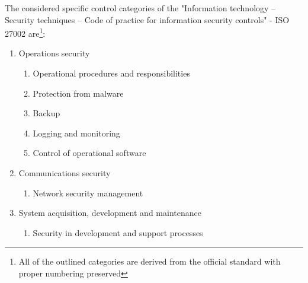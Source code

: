 The considered specific control categories of the "Information technology -- Security techniques -- Code of practice for information security controls" - ISO 27002 are\footnote{All of the outlined categories are derived from the official standard \cite{iso:27002} with proper numbering preserved}:
\begin{enumerate}[label=\arabic*.,ref={ISO-27002 category \theenumi},start=12]
	\item Operations security \label{iso.12}
	\begin{enumerate}[label=\arabic*.,ref=\theenumi.\arabic*]
		\item Operational procedures and responsibilities \label{iso.12.1}
		\item Protection from malware \label{iso.12.2}
		\item Backup \label{iso.12.3}
		\item Logging and monitoring \label{iso.12.4}
		\item Control of operational software \label{iso.12.5}
	\end{enumerate}
	\item Communications security \label{iso.13}
	\begin{enumerate}[label=\arabic*.,ref=\theenumi.\arabic*]
		\item Network security management \label{iso.13.1}
	\end{enumerate}
	\item System acquisition, development and maintenance \label{iso.14}
	\begin{enumerate}[label=\arabic*.,ref=\theenumi.\arabic*,start=2]
		\item Security in development and support processes \label{iso.14.2}
	\end{enumerate}
\end{enumerate}


